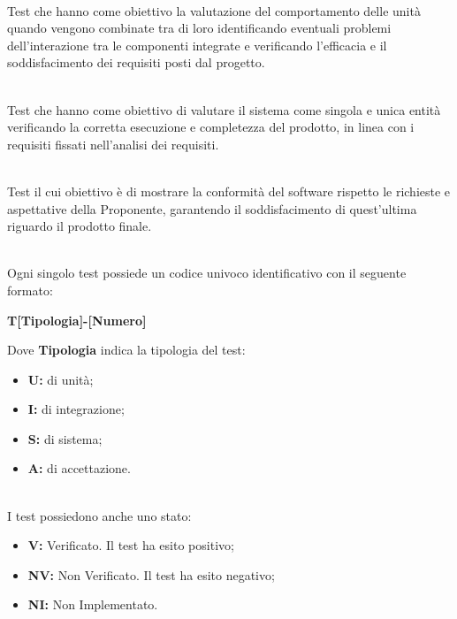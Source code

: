  \\
Test che hanno come obiettivo la valutazione del comportamento delle unità quando vengono combinate tra di loro identificando eventuali problemi dell'interazione tra le componenti integrate e verificando l'efficacia e il soddisfacimento dei requisiti posti dal progetto.

 \\
Test che hanno come obiettivo di valutare il sistema come singola e unica entità verificando la corretta esecuzione e completezza del prodotto, in linea con i requisiti fissati nell'analisi dei requisiti.

 \\
Test il cui obiettivo è di mostrare la conformità del software rispetto le richieste e aspettative della Proponente, garantendo il soddisfacimento di quest'ultima riguardo il prodotto finale.

 \\
Ogni singolo test possiede un codice univoco identificativo con il seguente formato:
\begin{center}
	\textbf{T[Tipologia]-[Numero]}
\end{center}
Dove \textbf{Tipologia} indica la tipologia del test: 
\begin{itemize}
    \item \textbf{U:} di unità;
	\item \textbf{I:} di integrazione;
	\item \textbf{S:} di sistema;
	\item \textbf{A:} di accettazione.
\end{itemize}

 \\
I test possiedono anche uno stato:
\begin{itemize}
	\item \textbf{V:} Verificato. Il test ha esito positivo;
	\item \textbf{NV:} Non Verificato. Il test ha esito negativo; 
	\item \textbf{NI:} Non Implementato.
\end{itemize}